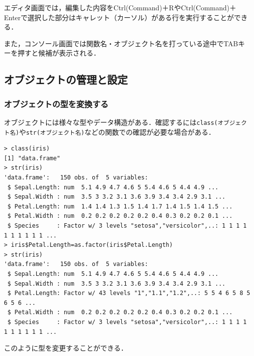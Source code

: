 エディタ画面では，編集した内容をCtrl(Command)＋RやCtrl(Command)＋Enterで選択した部分はキャレット（カーソル）がある行を実行することができる．

また，コンソール画面では関数名・オブジェクト名を打っている途中でTABキーを押すと候補が表示される．
\subsection{オブジェクトの管理と設定}
\subsubsection{オブジェクトの型を変換する}
オブジェクトには様々な型やデータ構造がある．確認するには\verb+class(オブジェクト名)+や\verb+str(オブジェクト名)+などの関数での確認が必要な場合がある．
\begin{breakbox}
\begin{verbatim}
> class(iris)
[1] "data.frame"
> str(iris)
'data.frame':   150 obs. of  5 variables:
 $ Sepal.Length: num  5.1 4.9 4.7 4.6 5 5.4 4.6 5 4.4 4.9 ...
 $ Sepal.Width : num  3.5 3 3.2 3.1 3.6 3.9 3.4 3.4 2.9 3.1 ...
 $ Petal.Length: num  1.4 1.4 1.3 1.5 1.4 1.7 1.4 1.5 1.4 1.5 ...
 $ Petal.Width : num  0.2 0.2 0.2 0.2 0.2 0.4 0.3 0.2 0.2 0.1 ...
 $ Species     : Factor w/ 3 levels "setosa","versicolor",..: 1 1 1 1 1 1 1 1 1 1 ...
> iris$Petal.Length=as.factor(iris$Petal.Length)
> str(iris)
'data.frame':   150 obs. of  5 variables:
 $ Sepal.Length: num  5.1 4.9 4.7 4.6 5 5.4 4.6 5 4.4 4.9 ...
 $ Sepal.Width : num  3.5 3 3.2 3.1 3.6 3.9 3.4 3.4 2.9 3.1 ...
 $ Petal.Length: Factor w/ 43 levels "1","1.1","1.2",..: 5 5 4 6 5 8 5 6 5 6 ...
 $ Petal.Width : num  0.2 0.2 0.2 0.2 0.2 0.4 0.3 0.2 0.2 0.1 ...
 $ Species     : Factor w/ 3 levels "setosa","versicolor",..: 1 1 1 1 1 1 1 1 1 1 ...
\end{verbatim}
\end{breakbox}
このように型を変更することができる．
